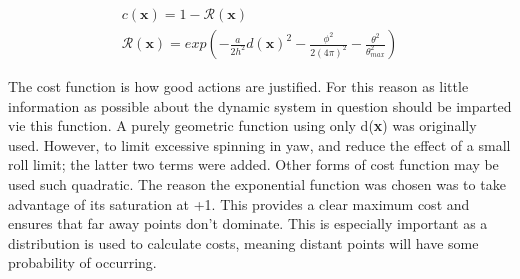 \documentclass[twoside,twocolumn,12pt]{article}
\begin{document}
\begin{equation}
\label{eq:simple}
\begin{gathered}
c(\textbf{x}) = 1 - \mathcal{R}(\textbf{x}) \\ 
\mathcal{R}(\textbf{x}) = exp(-\frac{a}{2h^2}d(\textbf{x})^2 - \frac{\phi^2}{2(4\pi)^2} - \frac{\theta^2}{\theta_{max}^2}) 
\end{gathered} 
\end{equation}

The cost function is how good actions are justified. For this reason as little information as possible about the dynamic system in question should be imparted vie this function. A purely geometric function using only d(\textbf{x}) was originally used. However, to limit excessive spinning in yaw, and reduce the effect of a small roll limit; the latter two terms were added.
\newline
Other forms of cost function may be used such  quadratic. The reason the exponential function was chosen was to take advantage of its saturation at +1. This provides a clear maximum cost and ensures that far away points don't dominate. This is especially important as a distribution is used to calculate costs, meaning distant points will have some probability of occurring. 

\clearpage
\end{document}
